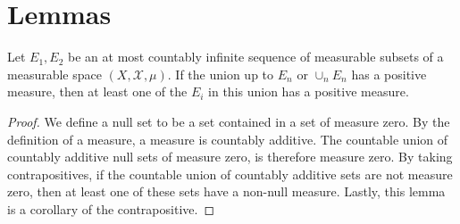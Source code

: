 \section{Lemmas}

\begin{lemma}
    Let $E_1, E_2$ be an at most countably infinite sequence of measurable subsets of a measurable space $(X, \mathcal{X}, \mu)$. If the union up to $E_n$ or $\cup_n E_n$ has a positive measure, then at least one of the $E_i$ in this union has a positive measure.  
\end{lemma}

\begin{proof}
    We define a null set to be a set contained in a set of measure zero. By the definition of a measure, a measure is countably additive. The countable union of countably additive null sets of measure zero, is therefore measure zero. By taking contrapositives, if the countable union of countably additive sets are not measure zero, then at least one of these sets have a non-null measure. Lastly, this lemma is a corollary of the contrapositive.
\end{proof}